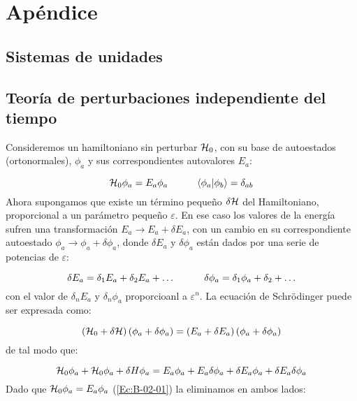 \appendix 
\chapter{Apéndice} \label{Ch:Anex_A}

\section{Sistemas de unidades}

\section{Teoría de perturbaciones independiente del tiempo}

Consideremos un hamiltoniano sin perturbar $\mathcal{H}_0$, con su base de autoestados (ortonormales), $\phi_a$ y sus correspondientes autovalores $E_a$:

\begin{equation}
    \mathcal{H}_0 \phi_a = E_a \phi_a \quad \quad \quad \langle \phi_a | \phi_b \rangle = \delta_{ab}
    \label{Ec:B-02-01}
\end{equation}
Ahora supongamos que existe un término pequeño $\delta \mathcal{H}$ del Hamiltoniano, proporcional a un parámetro pequeño $\varepsilon$. En ese caso los valores de la energía sufren una transformación $E_a \rightarrow E_a + \delta E_a$, con un cambio en su correspondiente autoestado $\phi_a \rightarrow \phi_a + \delta \phi_a$, donde $\delta E_a$ y $\delta \phi_a$ están dados por una serie de potencias de $\varepsilon$:

\begin{equation}
    \delta E_a = \delta_1 E_a + \delta_2 E_a + \ldots \quad \quad \quad \delta \phi_a = \delta_1 \phi_a + \delta_2 + \ldots 
\end{equation}
con el valor de $\delta_n E_a$ y $\delta_n \phi_a$ proporcioanl a $ \varepsilon^n$. La ecuación de Schrödinger puede ser expresada como:

\begin{equation}
    \left( \mathcal{H}_0 + \delta \mathcal{H} \right) \left( \phi_a + \delta \phi_a \right) = \left( E_a + \delta E_a \right) \left( \phi_a + \delta \phi_a \right)
\end{equation}
de tal modo que:

\begin{equation}
    \mathcal{H}_0  \phi_a + \mathcal{H}_0 \phi_a + \delta H \phi_a = E_a \phi_a + E_a \delta \phi_a + \delta E_a \phi_a + \delta E_a \delta \phi_a
\end{equation}
Dado que $\mathcal{H}_0 \phi_a = E_a \phi_a$ (\ref{Ec:B-02-01}) la eliminamos en ambos lados:
 
